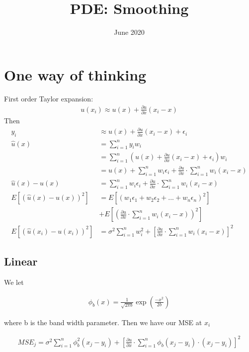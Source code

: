 \documentclass{article}
\title{PDE: Smoothing}
\date{June 2020}
\begin{document}
\maketitle

\section{One way of thinking}

First order Taylor expansion: 
\begin{align}
  u(x_i) \approx u(x) + \frac{\partial u}{\partial x}(x_i - x) 
\end{align}
Then 
\begin{align}
   y_i &\approx  u(x) + \frac{\partial u}{\partial x}(x_i - x) + \epsilon_i \\ 
    \hat{u}(x) &= \sum_{i=1}^n y_i w_i \\
   &= \sum_{i=1}^n \left( u(x) + \frac{\partial u}{\partial x}(x_i - x) + \epsilon_i \right) w_i \\
   &= u(x) + \sum_{i=1}^n  w_i \epsilon_i +  \frac{\partial u}{\partial x}\cdot \sum_{i=1}^n  w_i(x_i - x) \\ 
   \hat{u}(x) - u(x) &= \sum_{i=1}^n  w_i \epsilon_i +  \frac{\partial u}{\partial x}\cdot \sum_{i=1}^n  w_i(x_i - x) \\ 
     E\left[ \left(\hat{u}(x) - u(x)\right)^2 \right] &=  E\left[ \left(w_1\epsilon_1+w_2\epsilon_2+...+w_n\epsilon_n \right)^2 \right] \\&+  E\left[ \left( \frac{\partial u}{\partial x}\cdot \sum_{i=1}^n  w_i(x_i - x)\right)^2 \right] \\ 
     E\left[ \left(\hat{u}(x_i) - u(x_i)\right)^2 \right] &=  \sigma^2\sum_{i=1}^n  w_i^2  +  \left[ \frac{\partial u}{\partial x}\cdot \sum_{i=1}^n  w_i(x_i - x) \right]^2 
\end{align}


\subsection{Linear}
We let

\begin{align}
    \phi_b (x) = \frac{1}{\sqrt{2 \pi b}}\exp(\frac{-x^2}{2b})
\end{align}

where b is the band width parameter. Then we have our MSE at $x_i$

\begin{align}
   MSE_j =  \sigma^2\sum_{i=1}^n  \phi_b^2(x_j-y_i)  +  \left[ \frac{\partial u}{\partial x}\cdot \sum_{i=1}^n  \phi_b(x_j-y_i)\cdot(x_j - y_i) \right]^2 
\end{align}
\end{document}
